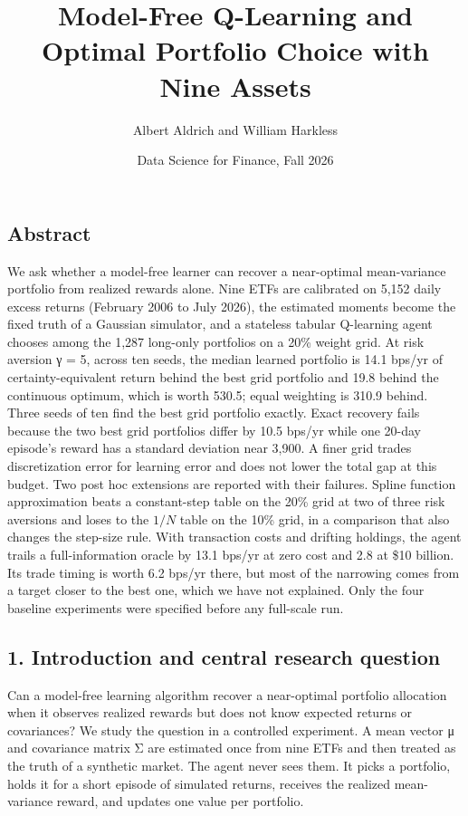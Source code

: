 \documentclass[
  11pt]{article}
\title{Model-Free Q-Learning and Optimal Portfolio Choice with Nine
Assets}
\author{Albert Aldrich and William Harkless}
\date{Data Science for Finance, Fall 2026}
\begin{document}
\maketitle

\subsection{Abstract}\label{abstract}

We ask whether a model-free learner can recover a near-optimal
mean-variance portfolio from realized rewards alone. Nine ETFs are
calibrated on 5,152 daily excess returns (February 2006 to July 2026),
the estimated moments become the fixed truth of a Gaussian simulator,
and a stateless tabular Q-learning agent chooses among the 1,287
long-only portfolios on a 20\% weight grid. At risk aversion γ = 5,
across ten seeds, the median learned portfolio is 14.1 bps/yr of
certainty-equivalent return behind the best grid portfolio and 19.8
behind the continuous optimum, which is worth 530.5; equal weighting is
310.9 behind. Three seeds of ten find the best grid portfolio exactly.
Exact recovery fails because the two best grid portfolios differ by 10.5
bps/yr while one 20-day episode's reward has a standard deviation near
3,900. A finer grid trades discretization error for learning error and
does not lower the total gap at this budget. Two post hoc extensions are
reported with their failures. Spline function approximation beats a
constant-step table on the 20\% grid at two of three risk aversions and
loses to the \(1/N\) table on the 10\% grid, in a comparison that also
changes the step-size rule. With transaction costs and drifting
holdings, the agent trails a full-information oracle by 13.1 bps/yr at
zero cost and 2.8 at \$10 billion. Its trade timing is worth 6.2 bps/yr
there, but most of the narrowing comes from a target closer to the best
one, which we have not explained. Only the four baseline experiments
were specified before any full-scale run.

\subsection{1. Introduction and central research
question}\label{introduction-and-central-research-question}

Can a model-free learning algorithm recover a near-optimal portfolio
allocation when it observes realized rewards but does not know expected
returns or covariances? We study the question in a controlled
experiment. A mean vector μ and covariance matrix Σ are estimated once
from nine ETFs and then treated as the truth of a synthetic market. The
agent never sees them. It picks a portfolio, holds it for a short
episode of simulated returns, receives the realized mean-variance
reward, and updates one value per portfolio.
\end{document}
